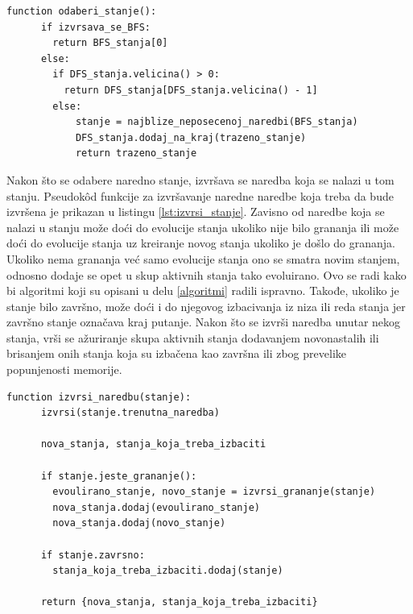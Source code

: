 \documentclass[12pt,oneside]{memoir}
\begin{document}
\begin{lstlisting}[caption={Pseudok\^od funkcije za odabir narednog stanja koje se izvršava},captionpos=b,label={lst:odaberi_stanje}]
    function odaberi_stanje():
      if izvrsava_se_BFS:
        return BFS_stanja[0]
      else:
        if DFS_stanja.velicina() > 0:
          return DFS_stanja[DFS_stanja.velicina() - 1]
        else:
            stanje = najblize_neposecenoj_naredbi(BFS_stanja)
            DFS_stanja.dodaj_na_kraj(trazeno_stanje)
            return trazeno_stanje
    \end{lstlisting}
    
Nakon što se odabere naredno stanje, izvršava se naredba koja se nalazi u tom stanju. Pseudok\^od funkcije za  izvršavanje naredne naredbe koja treba da bude izvršena je prikazan u listingu \ref{lst:izvrsi_stanje}. Zavisno od naredbe koja se nalazi u stanju može doći do evolucije stanja ukoliko nije bilo grananja ili može doći do evolucije stanja uz kreiranje novog stanja ukoliko je došlo do grananja. Ukoliko nema grananja već samo evolucije stanja ono se smatra novim stanjem, odnosno dodaje se opet u skup aktivnih stanja tako evoluirano. Ovo se radi kako bi algoritmi koji su opisani u delu \ref{algoritmi} radili ispravno. Takođe, ukoliko je stanje bilo završno, može doći i do njegovog izbacivanja iz niza ili reda stanja jer završno stanje označava kraj putanje. Nakon što se izvrši naredba unutar nekog stanja, vrši se ažuriranje skupa aktivnih stanja dodavanjem novonastalih ili brisanjem onih stanja koja su izbačena kao završna ili zbog prevelike popunjenosti memorije.

    \begin{lstlisting}[caption={Pseudok\^od funkcije koja izvršava naredbu koja se nalazi u stanju koje se prosleđuje kao parametar funkciji},captionpos=b,label={lst:izvrsi_stanje}]
    function izvrsi_naredbu(stanje):
      izvrsi(stanje.trenutna_naredba)
      
      nova_stanja, stanja_koja_treba_izbaciti
      
      if stanje.jeste_grananje():
        evoulirano_stanje, novo_stanje = izvrsi_grananje(stanje)
        nova_stanja.dodaj(evoulirano_stanje)
        nova_stanja.dodaj(novo_stanje)
      
      if stanje.zavrsno:
        stanja_koja_treba_izbaciti.dodaj(stanje)
        
      return {nova_stanja, stanja_koja_treba_izbaciti}
    \end{lstlisting}
    
\end{document}
